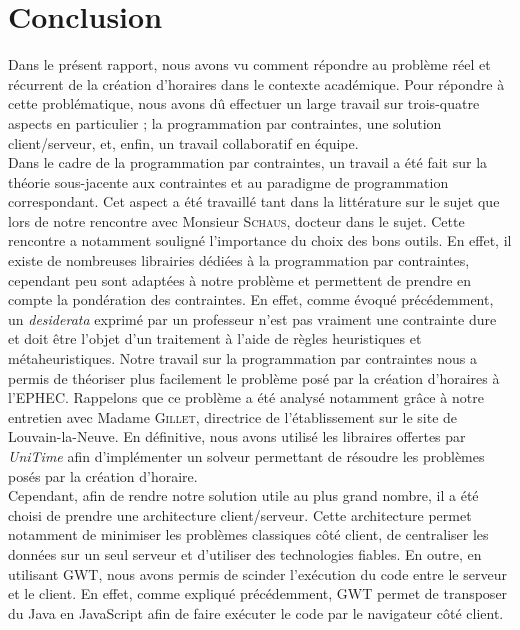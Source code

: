 \chapter*{Conclusion}

Dans le présent rapport, nous avons vu comment répondre au problème réel et récurrent de la création d'horaires dans le contexte académique. Pour répondre à cette problématique, nous avons dû effectuer un large travail sur trois-quatre aspects en particulier ; la programmation par contraintes, une solution client/serveur, et, enfin, un travail collaboratif en équipe.\\
\newline
\indent
Dans le cadre de la programmation par contraintes, un travail a été fait sur la théorie sous-jacente aux contraintes et au paradigme de programmation correspondant. Cet aspect a été travaillé tant dans la littérature sur le sujet que lors de notre rencontre avec Monsieur  \textsc{Schaus}, docteur dans le sujet.
Cette rencontre a notamment souligné l'importance du choix des bons outils. En effet, il existe de nombreuses librairies dédiées à la programmation par contraintes, cependant peu sont adaptées à notre problème et permettent de prendre en compte la pondération des contraintes. En effet, comme évoqué précédemment, un \textit{desiderata} exprimé par un professeur n'est pas vraiment une contrainte dure et doit être l'objet d'un traitement à l'aide de règles heuristiques et métaheuristiques.
\newline
\indent
Notre travail sur la programmation par contraintes nous a permis de théoriser plus facilement le problème posé par la création d'horaires à l'EPHEC. Rappelons que ce problème a été analysé notamment grâce à notre entretien avec Madame \textsc{Gillet}, directrice de l'établissement sur le site de Louvain-la-Neuve.
En définitive, nous avons utilisé les libraires offertes par \textit{UniTime} afin d'implémenter un solveur permettant de résoudre les problèmes posés par la création d'horaire.\\
\newline
\indent
Cependant, afin de rendre notre solution utile au plus grand nombre, il a été choisi de prendre une architecture client/serveur. Cette architecture permet notamment de minimiser les problèmes classiques côté client, de centraliser les données sur un seul serveur et d'utiliser des technologies fiables.
En outre, en utilisant GWT, nous avons permis de scinder l'exécution du code entre le serveur et le client. En effet, comme expliqué précédemment, GWT permet de transposer du Java en JavaScript afin de faire exécuter le code par le navigateur côté client.
